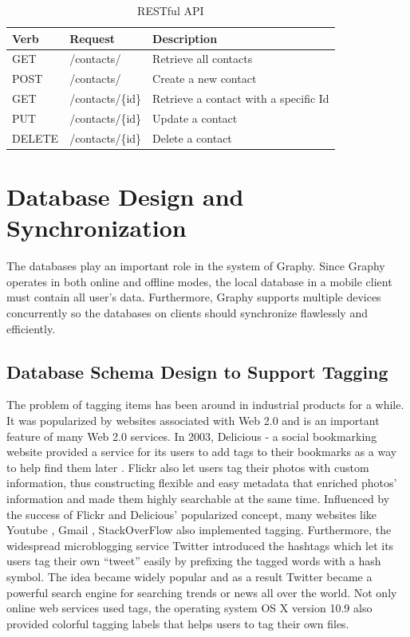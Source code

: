 \begin{table}[!ht]
\centering
\caption{RESTful API}\label{tb:restapi}
\begin{tabular}{| l | l | p{3.5cm} |} \hline
\textbf{Verb} & \textbf{Request} & \textbf{Description}\\ \hline
GET & /contacts/ & Retrieve all contacts\\ \hline
POST & /contacts/ & Create a new contact\\ \hline
GET & /contacts/\{id\} & Retrieve a contact with a specific Id\\ \hline
PUT & /contacts/\{id\} & Update a contact\\ \hline
DELETE & /contacts/\{id\} & Delete a contact\\ \hline
\end{tabular}
\end{table}

\section{Database Design and Synchronization}
The databases play an important role in the system of Graphy. Since Graphy operates in both online and offline modes, the local database in a mobile client must contain all user's data. Furthermore, Graphy supports multiple devices concurrently so the databases on clients should synchronize flawlessly and efficiently.

\subsection{Database Schema Design to Support Tagging}\label{databasedesign}
The problem of tagging items has been around in industrial products for a while. It was popularized by websites associated with Web 2.0 and is an important feature of many Web 2.0 services. In 2003, Delicious - a social bookmarking website provided a service for its users to add tags to their bookmarks as a way to help find them later \cite{delicious}. Flickr \cite{flickr} also let users tag their photos with custom information, thus constructing flexible and easy metadata that enriched photos' information and made them highly searchable at the same time. Influenced by the success of Flickr and Delicious' popularized concept, many websites like Youtube \cite{youtube}, Gmail \cite{gmail}, StackOverFlow \cite{stackoverflow} also implemented tagging. Furthermore, the widespread microblogging service Twitter \cite{twitter} introduced the hashtags which let its users tag their own ``tweet'' easily by prefixing the tagged words with a hash symbol. The idea became widely popular and as a result Twitter became a powerful search engine for searching trends or news all over the world. Not only online web services used tags, the operating system OS X version 10.9 also provided colorful tagging labels \cite{osxtag} that helps users to tag their own files.

